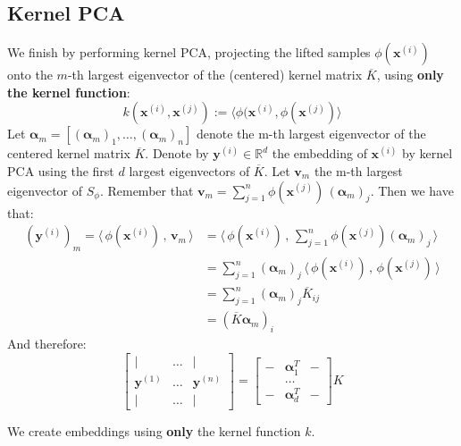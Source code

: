 \documentclass{article}
\begin{document}
\subsection{Kernel PCA}
We finish by performing kernel PCA, projecting the lifted samples $\phi(\bm{x}^{(i)})$ onto the $m$-th largest eigenvector of the (centered) kernel matrix $\overline{K}$, using \textbf{only the kernel function}:
\[
  k(\bm{x}^{(i)}, \bm{x}^{(j)}) := \langle \phi(\bm{x}^{(i)}, \phi(\bm{x}^{(j)}) \rangle
\]
Let $\bm{\alpha}_{m} = [(\bm{\alpha}_{m})_1, \ldots, (\bm{\alpha}_{m})_n]$ denote the m-th largest eigenvector of the centered kernel matrix $\overline{K}$. 
Denote by $\bm{y}^{(i)} \in \mathbb{R}^{d}$ the embedding of $\bm{x}^{(i)}$ by kernel PCA using the first $d$ largest eigenvectors of $\overline{K}$. 
Let $\bm{v}_{m}$ the m-th largest eigenvector of $S_{\phi}$. 
Remember that $\bm{v}_{m} = \sum_{j=1}^{n} \phi(\bm{x}^{(j)}) \, (\bm{\alpha}_m)_j$. 
Then we have that:
\begin{align*}
  (\bm{y}^{(i)})_{m} =  \langle \, \phi(\bm{x}^{(i)}) \,, \, \bm{v}_{m} \, \rangle &= \langle \, \phi(\bm{x}^{(i)}) \,, \, \sum_{j=1}^{n} \phi(\bm{x}^{(j)}) (\bm{\alpha}_m)_j \, \rangle  \\
  &=  \sum_{j=1}^{n} (\bm{\alpha}_m)_j \, \langle \, \phi(\bm{x}^{(i)}) \,, \, \phi(\bm{x}^{(j)}) \, \rangle \\
  &= \sum_{j=1}^{n} (\bm{\alpha}_{m})_j \overline{K}_{ij} \\
  &= (\overline{K} \bm{\alpha}_{m})_{i} 
\end{align*}
And therefore:
\[
  \begin{bmatrix} | & \ldots & | \\ \bm{y}^{(1)} & \ldots & \bm{y}^{(n)} \\ | & \ldots & | \end{bmatrix} = \begin{bmatrix} - & \bm{\alpha}_1 ^{T} & - \\ & \hdots & \\ - & \bm{\alpha}_{d}^{T} & -  \end{bmatrix} K
\]

We create embeddings using \textbf{only} the kernel function $k$. 
\end{document}
